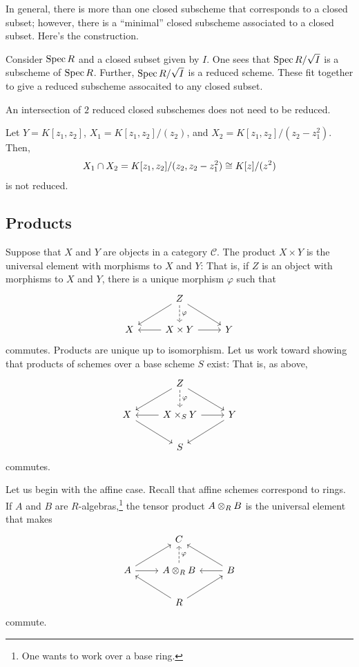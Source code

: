 \documentclass [11 pt, oneside] {article}
\begin{document}
In general, there is more than one closed subscheme that corresponds to a closed subset; however, there is a ``minimal'' closed subscheme associated to a closed subset. Here's the construction.

Consider $\operatorname{Spec} R$ and a closed subset given by $I$. One sees that $\operatorname{Spec} R/ \sqrt{I} $ is a subscheme of $\operatorname{Spec} R$. Further, $\operatorname{Spec} R/\sqrt{I} $ is a reduced scheme. These fit together to give a reduced subscheme assocaited to any closed subset.

\begin{warn}
	An intersection of $2$ reduced closed subschemes does not need to be reduced.
\end{warn}

\begin{example}
Let $Y = K[z_1,z_2]$, $X_1 = K[z_1,z_2]/(z_2)$, and $X_2 = K[z_1,z_2] / (z_2-z_1^2)$. Then, 
\begin{align*}
	X_1\cap X_2 = K[z_1,z_2] / (z_2,z_2-z_1^2) \cong K[z]/(z^2)
\end{align*}
is not reduced.
\end{example}

\subsection{Products}
Suppose that $X$ and $Y$ are objects in a category $\mathcal{C} $. The product $X\times Y$ is the universal element with morphisms to $X$ and $Y$: That is, if $Z$ is an object with morphisms to $X$ and $Y$, there is a unique morphism $\varphi$ such that
\[
\begin{tikzcd}
	&Z\ar[d,dashed, "\varphi"] \ar[dr]\ar[dl] \\
	X& X\times Y\ar[l]\ar[r]&Y
\end{tikzcd}
\]
commutes.
Products are unique up to isomorphism. Let us work toward showing that products of schemes over a base scheme $S$ exist: That is, as above,
\[
\begin{tikzcd}
	&Z\ar[dl] \ar[dr] \ar[d,dashed,"\varphi"] \\
	X\ar[dr]&X\times_S Y \ar[l]\ar[r] &Y\ar[dl]\\
	 &S
\end{tikzcd}
\]
commutes.

Let us begin with the affine case.
Recall that affine schemes correspond to rings. 
If $A$ and $B$ are $R$-algebras,\footnote{One wants to work over a base ring.} the tensor product $A\otimes_R B$ is the universal element that makes
\[
\begin{tikzcd}
	&C \\
	A\ar[ur] \ar[r]& A\tensor_R B\ar[u,dashed,swap,"\varphi"] & B\ar[l]\ar[ul]\\
		 & R \ar[ur]\ar[ul]
\end{tikzcd}
\]
commute.
\end{document}
